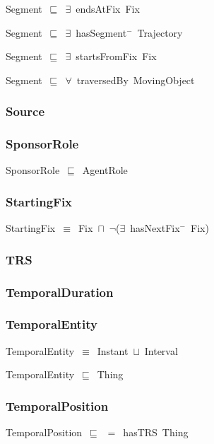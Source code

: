 \documentclass{article}
\begin{document}
Segment~\ensuremath{\sqsubseteq}~\ensuremath{\exists}~endsAtFix~Fix~

Segment~\ensuremath{\sqsubseteq}~\ensuremath{\exists}~hasSegment\ensuremath{^-}~Trajectory~

Segment~\ensuremath{\sqsubseteq}~\ensuremath{\exists}~startsFromFix~Fix~

Segment~\ensuremath{\sqsubseteq}~\ensuremath{\forall}~traversedBy~MovingObject~

\subsubsection*{Source}

\subsubsection*{SponsorRole}

SponsorRole~\ensuremath{\sqsubseteq}~AgentRole~

\subsubsection*{StartingFix}

StartingFix~\ensuremath{\equiv}~Fix~\ensuremath{\sqcap}~\ensuremath{\lnot}(\ensuremath{\exists}~hasNextFix\ensuremath{^-}~Fix)

\subsubsection*{TRS}

\subsubsection*{TemporalDuration}

\subsubsection*{TemporalEntity}

TemporalEntity~\ensuremath{\equiv}~Instant~\ensuremath{\sqcup}~Interval

TemporalEntity~\ensuremath{\sqsubseteq}~Thing~

\subsubsection*{TemporalPosition}

TemporalPosition~\ensuremath{\sqsubseteq}~\ensuremath{=}~hasTRS~Thing~
\end{document}
